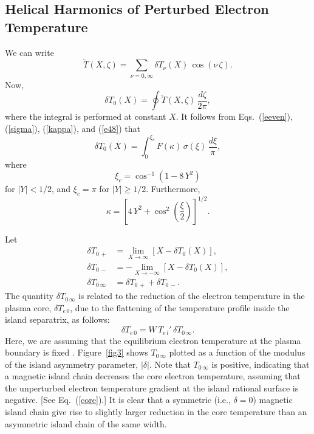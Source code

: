 \documentclass{iopjournal}
\begin{document}
\subsection{Helical Harmonics of Perturbed Electron Temperature}
We can write
\begin{equation}
\tilde{T}(X,\zeta)=\sum_{\nu=0,\infty}\delta T_\nu(X)\,\cos(\nu\,\zeta).
\end{equation}
Now,
\begin{equation}
\delta T_0(X) = \oint \tilde{T}(X,\zeta)\,\frac{d\zeta}{2\pi},
\end{equation}
where the integral is performed at constant $X$. It follows from Eqs.~(\ref{eeven}), (\ref{sigma}),  (\ref{kappa}), and (\ref{e48}) that
\begin{equation}
\delta T_0(X) = \int_0^{\xi_c}F(\kappa)\,\sigma(\xi)\,\frac{d\xi}{\pi},
\end{equation}
where 
\begin{equation}
\xi_c = \cos^{-1}(1-8\,Y^2)
\end{equation}
for $|Y|<1/2$, and $\xi_c=\pi$ for $|Y|\geq 1/2$. Furthermore,
\begin{equation}
\kappa =\left[4\,Y^2 +\cos^2\left(\frac{\xi}{2}\right)\right]^{1/2}.
\end{equation}

Let 
\begin{align}\label{e79}
\delta T_{0\,+} &=\lim_{X\rightarrow \infty}\left[X - \delta T_0(X)\right],\\[0.5ex]
\delta T_{0\,-} &=-\lim_{X\rightarrow -\infty}\left[X - \delta T_0(X)\right],\\[0.5ex]
\delta T_{0\,\infty} &= \delta T_{0\,+}+ \delta T_{0\,-}.
\end{align}
The quantity $\delta T_{0\,\infty}$ is related to the reduction of the electron temperature in the plasma core, $\delta T_{e\,0}$, due to the flattening of the
temperature profile inside the island separatrix, as follows:
\begin{equation}\label{core}
\delta T_{e\,0} = W\,T_{e\,l}'\,\delta T_{0\,\infty}.
\end{equation}
Here, we are assuming that the equilibrium electron temperature at the plasma boundary is fixed \cite{chang}.
Figure~\ref{fig3} shows $T_{0\,\infty}$ plotted as a function of the modulus of the island asymmetry parameter, $|\delta|$.  
Note that $T_{0\,\infty}$ is positive, indicating that a magnetic island chain decreases the core electron temperature, assuming that the
unperturbed electron temperature gradient at the island rational surface is negative. [See Eq.~(\ref{core}).] It is clear that a symmetric (i.e., $\delta=0$) magnetic
island chain give rise to slightly larger reduction in the core temperature than an asymmetric island chain of the same width. 
\end{document}
